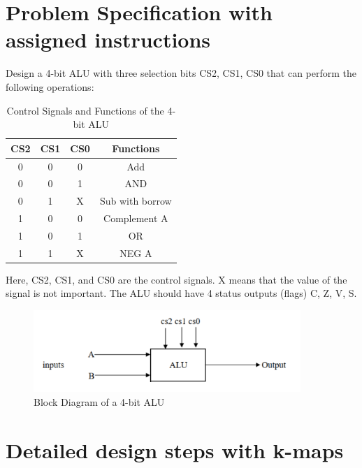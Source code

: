 \documentclass[11pt]{article}
\begin{document}
\section{Problem Specification with assigned instructions}
Design a 4-bit ALU with three selection bits CS2, CS1, CS0 that can perform the following operations:
\begin{table}[ht]
    \centering
    \begin{tabular}{|c|c|c|c|}
        \hline
        \textbf{CS2} & \textbf{CS1} & \textbf{CS0} & \textbf{Functions} \\
        \hline
        0 & 0 & 0 & Add \\
        \hline
        0 & 0 & 1 & AND \\
        \hline
        0 & 1 & X & Sub with borrow \\
        \hline
        1 & 0 & 0 & Complement A \\
        \hline
        1 & 0 & 1 & OR \\
        \hline
        1 & 1 & X & NEG A \\
        \hline
    \end{tabular}
    \caption{Control Signals and Functions of the 4-bit ALU}
\end{table}

Here, CS2, CS1, and CS0 are the control signals. X means that the value of the signal is not important. The ALU should have 4 status outputs (flags) C, Z, V, S.
\begin{figure}[ht]
    \centering
    \includegraphics[width=0.9\textwidth]{images/ALU2.png}
    \caption{Block Diagram of a 4-bit ALU}
\end{figure}

\section{Detailed design steps with k-maps}
\end{document}
